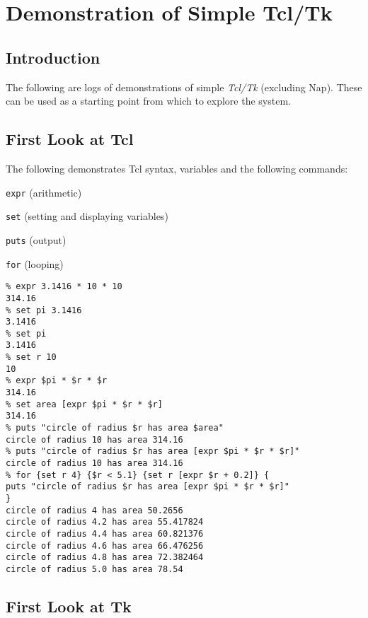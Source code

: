 
\section{Demonstration of Simple Tcl/Tk}

\subsection{Introduction}
    \label{Introduction}

The following are logs of demonstrations of simple 
  \emph{Tcl/Tk} (excluding Nap). These can be used as a starting
  point from which to explore the system.

\subsection{First Look at Tcl}
    \label{tcl1}

The following demonstrates Tcl syntax, variables and the
  following commands:
\begin{bullets}
    \item 
    \texttt{expr} (arithmetic)
    \item 
    \texttt{set} (setting and displaying variables)
    \item 
    \texttt{puts} (output)
    \item 
    \texttt{for} (looping)
\end{bullets}
  \begin{verbatim}
% expr 3.1416 * 10 * 10
314.16
% set pi 3.1416
3.1416
% set pi
3.1416
% set r 10
10
% expr $pi * $r * $r
314.16
% set area [expr $pi * $r * $r]
314.16
% puts "circle of radius $r has area $area"
circle of radius 10 has area 314.16
% puts "circle of radius $r has area [expr $pi * $r * $r]"
circle of radius 10 has area 314.16
% for {set r 4} {$r < 5.1} {set r [expr $r + 0.2]} {
puts "circle of radius $r has area [expr $pi * $r * $r]"
}
circle of radius 4 has area 50.2656
circle of radius 4.2 has area 55.417824
circle of radius 4.4 has area 60.821376
circle of radius 4.6 has area 66.476256
circle of radius 4.8 has area 72.382464
circle of radius 5.0 has area 78.54
\end{verbatim}

\subsection{First Look at Tk}
    \label{tcl-log-tk1}

